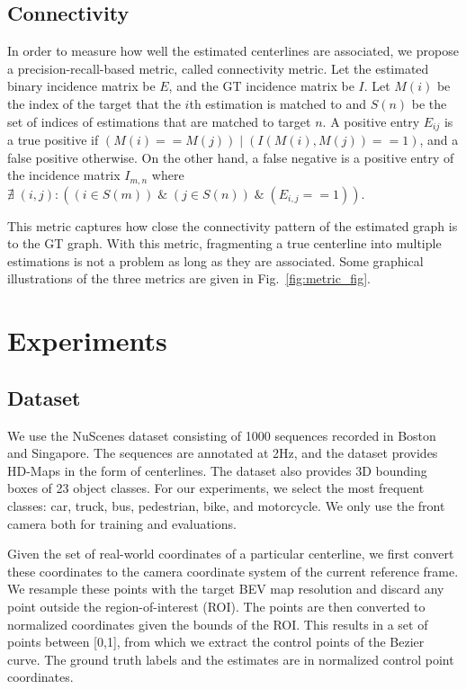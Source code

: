 \documentclass[10pt,twocolumn,letterpaper]{article}
\begin{document}
\subsection{Connectivity}

In order to measure how well the estimated centerlines are associated, we propose a precision-recall-based metric, called connectivity metric. Let the estimated binary incidence matrix be $E$, and the GT incidence matrix be $I$. Let $M(i)$ be the index of the target that the $i$th estimation is matched to and $S(n)$ be the set of indices of estimations that are matched to target $n$. A positive entry $E_{ij}$ is a true positive if ${(M(i) == M(j)) \;|\; (I(M(i), M(j)) == 1)}$, and a false positive otherwise. On the other hand, a false negative is a positive entry of the incidence matrix $I_{m,n}$ where ${\nexists \;(i,j) : ((i \in S(m))\; \& \;(j \in S(n))\; \& \;(E_{i,j}==1))}$. 

This metric captures how close the connectivity pattern of the estimated graph is to the GT graph. With this metric, fragmenting a true centerline into multiple estimations is not a problem as long as they are associated. Some graphical illustrations of the three metrics are given in Fig.~\ref{fig:metric_fig}. 






\section{Experiments}

\subsection{Dataset}

We use the NuScenes \cite{nuscenes2019} dataset consisting of 1000 sequences recorded in Boston and Singapore. The sequences are annotated at 2Hz, and the dataset provides HD-Maps in the form of centerlines. The dataset also provides 3D bounding boxes of 23 object classes. For our experiments, we select the most frequent classes: car, truck, bus, pedestrian, bike, and motorcycle. We only use the front camera both for training and evaluations. 

Given the set of real-world coordinates of a particular centerline, we first convert these coordinates to the camera coordinate system of the current reference frame. We resample these points with the target BEV map resolution and discard any point outside the region-of-interest (ROI). The points are then converted to normalized coordinates given the bounds of the ROI. This results in a set of points between [0,1], from which we extract the control points of the Bezier curve. The ground truth labels and the estimates are in normalized control point coordinates. 
\end{document}
